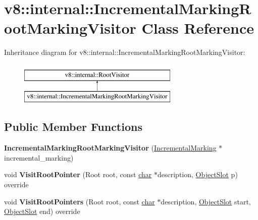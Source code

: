 \hypertarget{classv8_1_1internal_1_1IncrementalMarkingRootMarkingVisitor}{}\section{v8\+:\+:internal\+:\+:Incremental\+Marking\+Root\+Marking\+Visitor Class Reference}
\label{classv8_1_1internal_1_1IncrementalMarkingRootMarkingVisitor}
Inheritance diagram for v8\+:\+:internal\+:\+:Incremental\+Marking\+Root\+Marking\+Visitor\+:\begin{figure}[H]
\begin{center}
\leavevmode
\includegraphics[height=2.000000cm]{classv8_1_1internal_1_1IncrementalMarkingRootMarkingVisitor}
\end{center}
\end{figure}
\subsection*{Public Member Functions}
\begin{DoxyCompactItemize}
\item 
\mbox{\label{classv8_1_1internal_1_1IncrementalMarkingRootMarkingVisitor_a5ff6cdf642190e114e91dbd4050ff5a9}} 
{\bfseries Incremental\+Marking\+Root\+Marking\+Visitor} (\mbox{\hyperlink{classv8_1_1internal_1_1IncrementalMarking}{Incremental\+Marking}} $\ast$incremental\+\_\+marking)
\item 
\mbox{\label{classv8_1_1internal_1_1IncrementalMarkingRootMarkingVisitor_ad2036527875cd9f607d41807d2530ca7}} 
void {\bfseries Visit\+Root\+Pointer} (Root root, const \mbox{\hyperlink{classchar}{char}} $\ast$description, \mbox{\hyperlink{classv8_1_1internal_1_1ObjectSlot}{Object\+Slot}} p) override
\item 
\mbox{\label{classv8_1_1internal_1_1IncrementalMarkingRootMarkingVisitor_ab8c582d89c76b7eb17e30c541524bd5d}} 
void {\bfseries Visit\+Root\+Pointers} (Root root, const \mbox{\hyperlink{classchar}{char}} $\ast$description, \mbox{\hyperlink{classv8_1_1internal_1_1ObjectSlot}{Object\+Slot}} start, \mbox{\hyperlink{classv8_1_1internal_1_1ObjectSlot}{Object\+Slot}} end) override
\end{DoxyCompactItemize}
